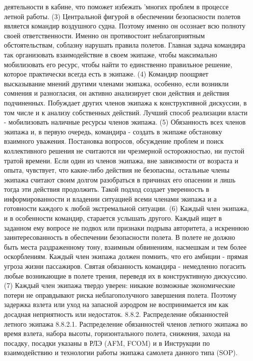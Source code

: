 деятельности в кабине, что поможет избежать 'многих проблем в процессе летной работы.
(3) Центральной фигурой в обеспечении безопасности полетов является командир воздушного судна. Поэтому именно он осознает всю полноту своей ответственности. Именно он противостоит неблагоприятным обстоятельствам, соблазну нарушать правила полетов. Главная задача командира так организовать взаимодействие в своем экипаже, чтобы максимально мобилизовать его ресурс, чтобы найти то единственно правильное решение, которое практически всегда есть в экипаже.
(4) Командир поощряет высказывание мнений другими членами экипажа, особенно, если возникли сомнения и разногласия, он активно анализирует свои действия и действия подчиненных. Побуждает других членов экипажа к конструктивной дискуссии, в том числе и к анализу собственных действий. Лучший способ реализации власти - мобилизовать наличные ресурсы членов экипажа.
(5) Обязанность всех членов экипажа и, в первую очередь, командира - создать в экипаже обстановку взаимного уважения. Постановка вопросов, обсуждение проблем и поиск коллективного решения не считаются ни чрезмерной осторожностью, ни пустой тратой времени. Если один из членов экипажа, вне зависимости от возраста и опыта, чувствует, что какие-либо действия не безопасны, остальные члены экипажа считают своим долгом разобраться в причинах его опасении и лишь тогда эти действия продолжить. Такой подход создает уверенность в информированности и владении ситуацией всеми членами экипажа и а готовности каждого к любой экстремальной ситуации.
(6) Каждый член экипажа, и в особенности командир, старается услышать другого. Каждый ищет в заданном ему вопросе не подвох или признаки подрыва авторитета, а искреннюю заинтересованность в обеспечении безопасности полета. В полете не должно быть места раздраженному тону, взаимным обвинениям, насмешкам и тем более оскорблениям. Каждый член экипажа должен помнить, что его амбиции - прямая угроза жизни пассажиров. Святая обязанность командира - немедленно погасить любые возникающие в полете трения, переведя их в конструктивную дискуссию.
(7) Каждый член экипажа твердо уверен: никакие возможные экономические потери не оправдывают риска неблагополучного завершения полета. Поэтому задержка взлета или уход на запасной аэродром не воспринимается им как досадная неприятность или недостаток.
8.8.2. Распределение обязанностей летного экипажа
8.8.2.1. Распределение обязанностей членов летного экипажа во время взлета, набора высоты, горизонтального полета, снижения, захода на посадку, посадки указаны в РЛЭ (AFM, FCOM) и в Инструкции по взаимодействию и технологии работы экипажа самолета данного типа (SOP).
